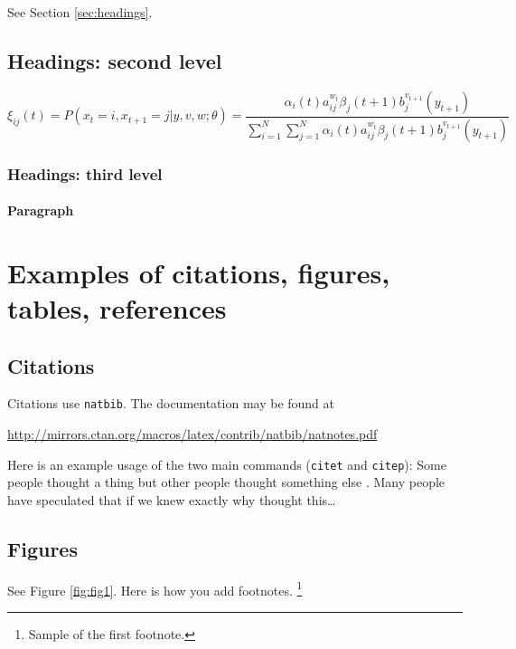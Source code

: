 \documentclass{article}
\begin{document}
\lipsum[4] See Section \ref{sec:headings}.

\subsection{Headings: second level}
\lipsum[5]
\begin{equation}
	\xi _{ij}(t)=P(x_{t}=i,x_{t+1}=j|y,v,w;\theta)= {\frac {\alpha _{i}(t)a^{w_t}_{ij}\beta _{j}(t+1)b^{v_{t+1}}_{j}(y_{t+1})}{\sum _{i=1}^{N} \sum _{j=1}^{N} \alpha _{i}(t)a^{w_t}_{ij}\beta _{j}(t+1)b^{v_{t+1}}_{j}(y_{t+1})}}
\end{equation}

\subsubsection{Headings: third level}
\lipsum[6]

\paragraph{Paragraph}
\lipsum[7]



\section{Examples of citations, figures, tables, references}
\label{sec:others}

\subsection{Citations}
Citations use \verb+natbib+. The documentation may be found at
\begin{center}
	\url{http://mirrors.ctan.org/macros/latex/contrib/natbib/natnotes.pdf}
\end{center}

Here is an example usage of the two main commands (\verb+citet+ and \verb+citep+): Some people thought a thing \citep{kour2014real, keshet2016prediction} but other people thought something else \citep{kour2014fast}. Many people have speculated that if we knew exactly why \citet{kour2014fast} thought this\dots

\subsection{Figures}
\lipsum[10]
See Figure \ref{fig:fig1}. Here is how you add footnotes. \footnote{Sample of the first footnote.}
\lipsum[11]
\end{document}
